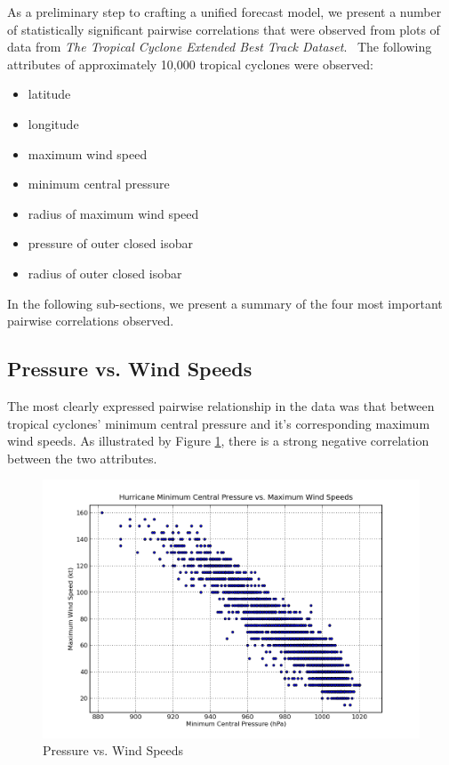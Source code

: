 \documentclass[letterpaper,twocolumn,10pt]{article}
\begin{document}
As a preliminary step to crafting a unified forecast model, we present a number
of statistically significant pairwise correlations that were observed from
plots of data from \emph{The Tropical Cyclone Extended Best Track
Dataset}.~\cite{BestTrackDataset} The following attributes of approximately 
10,000 tropical cyclones were observed:
\begin{itemize}
  \item latitude
  \item longitude
  \item maximum wind speed
  \item minimum central pressure
  \item radius of maximum wind speed
  \item pressure of outer closed isobar
  \item radius of outer closed isobar
\end{itemize}
In the following sub-sections, we present a summary of the four most important
pairwise correlations observed.


\subsection{Pressure vs. Wind Speeds}

The most clearly expressed pairwise relationship in the data was that between
tropical cyclones' minimum central pressure and it's corresponding maximum wind
speeds. As illustrated by Figure \ref{pressure_vs_speed}, there is
a strong negative correlation between the two attributes.
\begin{figure}[h!]
  \centering
  \includegraphics[scale=0.31]{pressure_vs_speed.png}
  \caption{Pressure vs. Wind Speeds}
  \label{pressure_vs_speed}
\end{figure}
\end{document}
